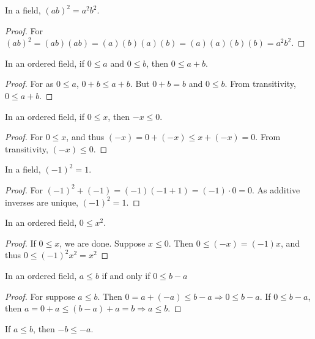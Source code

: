 \documentclass[crop=false,class=article,oneside]{standalone}
\begin{document}
            \begin{theorem}
            In a field, $(ab)^2 = a^2b^2$.
            \end{theorem}
            \begin{proof}
            For $(ab)^2 = (ab)(ab)=(a)(b)(a)(b)= (a)(a)(b)(b)=a^2b^2$.
            \end{proof}
            \begin{theorem} In an ordered field, if $0\leq a$ and $0\leq b$, then $0\leq a+b$.
            \end{theorem}
            \begin{proof}
            For as $0\leq a$, $0+b\leq a+b$. But $0+b = b$ and $0\leq b$. From transitivity, $0\leq a+b$.
            \end{proof}
            \begin{theorem}
            In an ordered field, if $0\leq x$, then $-x\leq 0$.
            \end{theorem}
            \begin{proof}
            For $0\leq x$, and thus $(-x)=0+(-x)\leq x+(-x) =0$. From transitivity, $(-x)\leq 0$.
            \end{proof}
            \begin{theorem}
            In a field, $(-1)^2 = 1$.
            \end{theorem}
            \begin{proof}
            For $(-1)^2 +(-1) = (-1)(-1+1) = (-1)\cdot 0 = 0$. As additive inverses are unique, $(-1)^2 = 1$.
            \end{proof}
            \begin{theorem}
            In an ordered field, $0\leq x^2$.
            \end{theorem}
            \begin{proof}
            If $0 \leq x$, we are done. Suppose $x\leq 0$. Then $0\leq (-x) = (-1)x$, and thus $0\leq (-1)^2 x^2=x^2$
            \end{proof}
            \begin{theorem}
            In an ordered field, $a\leq b$ if and only if $0 \leq b-a$
            \end{theorem}
            \begin{proof}
            For suppose $a\leq b$. Then $0=a+(-a)\leq b-a\Rightarrow 0 \leq b-a$. If $0\leq b-a$, then $a=0+a \leq (b-a)+a = b\Rightarrow a\leq b$.
            \end{proof}
            \begin{corollary}
            If $a\leq b$, then $-b\leq -a$.
            \end{corollary}
\end{document}

